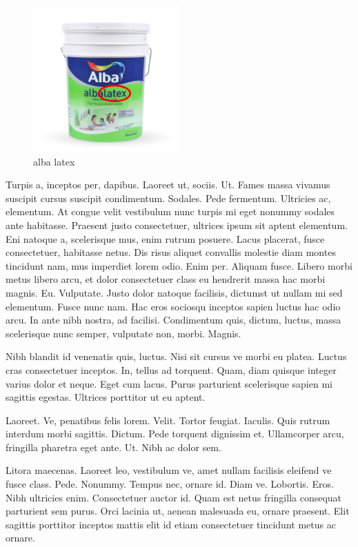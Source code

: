 \documentclass[a5paper,10pt,twocolumn,twoside]{book}
\begin{document}
\begin{figure}
  \begin{center}
    \includegraphics[width=0.5\textwidth]{img/alba_latex_final.png}
    \caption{alba latex}
    \label{fig:}
  \end{center}
\end{figure}

Turpis a, inceptos per, dapibus. Laoreet ut, sociis. Ut. Fames massa vivamus suscipit cursus suscipit condimentum. Sodales. Pede fermentum. Ultricies ac, elementum. At congue velit vestibulum nunc turpis mi eget nonummy sodales ante habitasse. Praesent justo consectetuer, ultrices ipsum sit aptent elementum. Eni natoque a, scelerisque mus, enim rutrum posuere. Lacus placerat, fusce consectetuer, habitasse netus. Dis risus aliquet convallis molestie diam montes tincidunt nam, mus imperdiet lorem odio. Enim per. Aliquam fusce. Libero morbi metus libero arcu, et dolor consectetuer class eu hendrerit massa hac morbi magnis. Eu. Vulputate. Justo dolor natoque facilisis, dictumst ut nullam mi sed elementum. Fusce nunc nam. Hac eros sociosqu inceptos sapien luctus hac odio arcu. In ante nibh nostra, ad facilisi. Condimentum quis, dictum, luctus, massa scelerisque nunc semper, vulputate non, morbi. Magnis.

Nibh blandit id venenatis quis, luctus. Nisi sit cursus ve morbi eu platea. Luctus cras consectetuer inceptos. In, tellus ad torquent. Quam, diam quisque integer varius dolor et neque. Eget cum lacus. Purus parturient scelerisque sapien mi sagittis egestas. Ultrices porttitor ut eu aptent.

Laoreet. Ve, penatibus felis lorem. Velit. Tortor feugiat. Iaculis. Quis rutrum interdum morbi sagittis. Dictum. Pede torquent dignissim et. Ullamcorper arcu, fringilla pharetra eget ante. Ut. Nibh ac dolor sem.

Litora maecenas. Laoreet leo, vestibulum ve, amet nullam facilisis eleifend ve fusce class. Pede. Nonummy. Tempus nec, ornare id. Diam ve. Lobortis. Eros. Nibh ultricies enim. Consectetuer auctor id. Quam est netus fringilla consequat parturient sem purus. Orci lacinia ut, aenean malesuada eu, ornare praesent. Elit sagittis porttitor inceptos mattis elit id etiam consectetuer tincidunt metus ac ornare.
\end{document}
